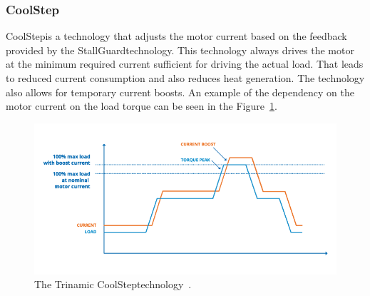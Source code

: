 \subsubsection{CoolStep\texttrademark}
CoolStep\texttrademark is a technology that adjusts the motor current based on the feedback provided by the StallGuard\texttrademark technology.
This technology always drives the motor at the minimum required current sufficient for driving the actual load.
That leads to reduced current consumption and also reduces heat generation.
The technology also allows for temporary current boosts.
An example of the dependency on the motor current on the load torque can be seen in the Figure~\ref{fig:torque_current}.

\begin{figure}[H]
    \centering
    \includegraphics[width=\textwidth]{obrazky/Trinamic_CoolStep}
    \caption{The Trinamic CoolStep\texttrademark technology~\cite{trinamic_trinamic_nodate}.}
    \label{fig:torque_current}
\end{figure}
